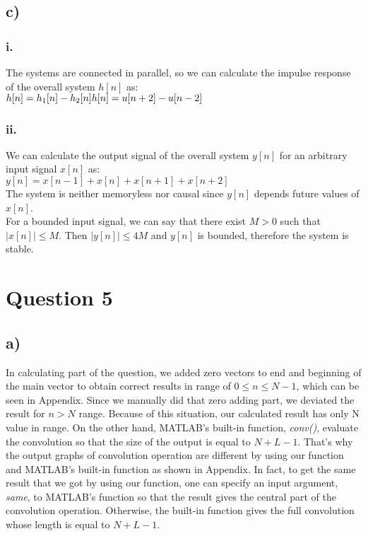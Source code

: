 \documentclass[12pt]{article}
\begin{document}
    \subsection*{c)}
    \subsubsection*{i.}
    The systems are connected in parallel, so we can calculate 
    the impulse response of the overall system \(h[n]\) as:\\
    \begin{math}
      h[n] = h_1[n] - h_2[n]\\
      h[n] = u[n+2] - u[n-2]\\
    \end{math}
    \subsubsection*{ii.}
    We can calculate the output signal of the overall system \(y[n]\)
    for an arbitrary input signal \(x[n]\) as:\\
    \begin{math}
      y[n] = x[n-1] + x[n] + x[n+1] + x[n+2]
    \end{math}\\
    The system is neither memoryless nor causal since \(y[n]\)
    depends future values of \(x[n]\).\\
    For a bounded input signal, we can say that there exist \(M > 0\) 
    such that \(\left\lvert x[n]\right\rvert \leq M \). Then \(\left\lvert y[n]\right\rvert  \leq 4M\) 
    and \(y[n]\) is bounded, therefore the system is stable. 
   
    \section*{Question 5}
    \subsection*{a)}
In calculating part of the question, we added zero vectors to end and beginning of the main vector to obtain correct results in range of \(0\leq n \leq N-1\), which can be seen in Appendix. Since we manually did that zero adding part, we deviated the result for \(n>N\) range. Because of this situation, our calculated result has only N value in range. On the other hand, MATLAB’s built-in function, \emph{conv()}, evaluate the convolution so that the size of the output is equal to \(N+L-1\). That's why the output graphs of convolution operation are different by using our function and MATLAB's built-in function as shown in Appendix. In fact, to get the same result that we got by using our function, one can specify an input argument, \emph{same}, to MATLAB's function so that the result gives the central part of the convolution operation. Otherwise, the built-in function gives the full convolution whose length is equal to \(N+L-1\).
\end{document}
